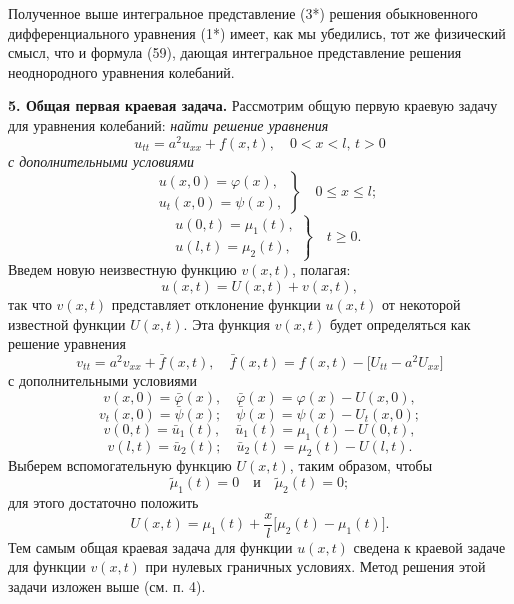 \documentclass[a4paper,10pt]{article}
\begin{document}
\thispagestyle{fancy}
\setcounter{page}{103}
\setcounter{section}{2} 
Полученное выше интегральное представление (3*) решения обыкновенного дифференциального уравнения (1*) имеет, как мы убедились, тот же физический смысл, что и формула (59), дающая интегральное представление решения неоднородного уравнения колебаний.

\textbf{5. Общая первая краевая задача.} Рассмотрим общую первую краевую задачу для уравнения колебаний:
\textit{найти решение уравнения}
\[
u_{tt} = a^2 u_{xx} + f(x, t), \quad 0 < x < l, \, t > 0
\tag{45}
\]
\textit{с дополнительными условиями}
\[
\left.
\begin{aligned}
&u(x, 0) = \varphi(x), \\
&u_t(x, 0) = \psi(x),
\end{aligned}
\right\}
\quad 0 \leq x \leq l;
\tag{46}
\]
\[
\left.
\begin{aligned}
&u(0, t) = \mu_1(t), \\
&u(l, t) = \mu_2(t),
\end{aligned}
\right\}
\quad t \geq 0.
\tag{47}
\]
Введем новую неизвестную функцию \(v(x, t)\), полагая:
\[
u(x, t) = U(x, t) + v(x, t),
\]
так что \(v(x, t)\) представляет отклонение функции \(u(x, t)\) от некоторой известной функции \(U(x, t)\).
Эта функция \(v(x, t)\) будет определяться как решение уравнения
\[
v_{tt} = a^2 v_{xx} +\bar f(x, t), \quad \bar f(x, t) = f(x, t) - \bigl[U_{tt} - a^2 U_{xx}\bigr]
\]
с дополнительными условиями
\[
v(x, 0) = \bar{\varphi}(x), \quad \bar{\varphi}(x) = \varphi(x) - U(x, 0),
\]
\[
v_t(x, 0) = \bar{\psi}(x); \quad \bar{\psi}(x) = \psi(x) - U_t(x, 0);
\]
\[
v(0, t) = \bar{u}_1(t), \quad \bar{u}_1(t) = \mu_1(t) - U(0, t),
\]
\[
v(l, t) = \bar{u}_2(t); \quad \bar{u}_2(t) = \mu_2(t) - U(l, t).
\]
Выберем вспомогательную функцию \(U(x, t)\), таким образом, чтобы
\[
\tilde{\mu}_1(t) = 0 \quad \text{и} \quad \tilde{\mu}_2(t) = 0;
\]
для этого достаточно положить
\[
U(x, t) = \mu_1(t) + \frac{x}{l} \bigl[\mu_2(t) - \mu_1(t)\bigr].
\]
Тем самым общая краевая задача для функции \( u(x, t) \) сведена к краевой задаче для функции \( v(x, t) \) при нулевых граничных условиях. Метод решения этой задачи изложен выше (см. п. 4).
\newpage  
\end{document}
